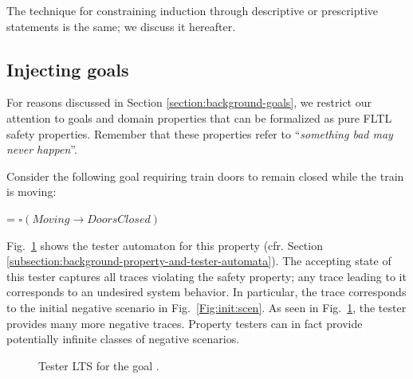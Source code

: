 The technique for constraining induction through descriptive or prescriptive statements is the same; we discuss it hereafter.


\subsection{Injecting goals\label{subsection:induction-pruning-with-goals}}

For reasons discussed in Section \ref{section:background-goals}, we restrict our attention to goals and domain properties that can be formalized as pure FLTL safety properties. Remember that these properties refer to  ``\emph{something bad may never happen}''.

Consider the following goal requiring train doors to remain closed while the train is moving:
\begin{center}
 = $\square(Moving \rightarrow DoorsClosed)$
\end{center}

Fig.~\ref{Fig.:tester-automaton-inductive} shows the tester automaton for this property (cfr. Section \ref{subsection:background-property-and-tester-automata}). The accepting state of this tester captures all traces violating the safety property; any trace leading to it corresponds to an undesired system behavior. In particular, the trace  corresponds to the initial negative scenario in Fig.~\ref{Fig:init:scen}. As seen in Fig.~\ref{Fig.:tester-automaton-inductive}, the tester provides many more negative traces. Property testers can in fact provide potentially infinite classes of negative scenarios.

\begin{figure}
\centering
{}
\caption{Tester LTS for the goal .\label{Fig.:tester-automaton-inductive}}
\end{figure}

